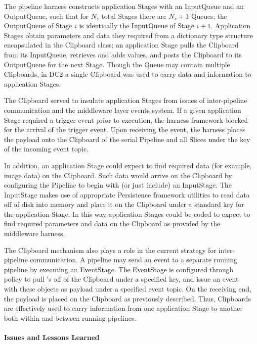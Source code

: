 The pipeline harness constructs application Stages with an InputQueue and an OutputQueue,
such that for $N_s$ total Stages there are $N_s+1$ Queues; the OutputQueue of Stage $i$ is 
identically the InputQueue of Stage $i+1$. 
Application Stages obtain parameters and data they required from a dictionary type 
structure encapsulated in the Clipboard class; an application Stage pulls the Clipboard
from its InputQueue, retrieves and adds values, and posts the Clipboard to its OutputQueue 
for the next Stage. Though the Queue may contain multiple Clipboards, in DC2 a single Clipboard was used to  carry data and information to application Stages.  

The Clipboard served to insulate application
Stages from issues of inter-pipeline communication and the middleware layer events system.
If  a given application Stage required a trigger event prior to execution, the harness framework
blocked for the arrival of the trigger event. Upon receiving the event, the  harness places 
the payload onto the Clipboard of the serial Pipeline and all Slices under the key of the 
incoming event topic.   

In addition, an application Stage could expect to find required data
(for example, image data) on the Clipboard.  Such data would arrive on the Clipboard by 
configuring the Pipeline to begin with (or just include) an InputStage. The InputStage makes use 
of appropriate Persistence framework utilities to read data off of disk into memory and place it on the Clipboard under a  standard key for
the application Stage.   In this way application Stages could be  coded  to expect to 
find required parameters and data on the Clipboard as provided by the middleware harness.

The Clipboard mechanism also plays a role in the  current strategy for inter-pipeline communication.
 A pipeline may send an event to a separate running pipeline by executing an 
EventStage. The EventStage is configured through policy to pull 's off of the
Clipboard under a specified key, and issue an event with these objects as payload under a 
specified event topic.   On the receiving end, the  payload is placed on the Clipboard as 
previously described.  Thus, Clipboards are effectively used to carry information from 
one application Stage to another both within and between running pipelines. 

\paragraph{Issues and Lessons Learned}


